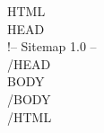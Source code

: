 \documentclass{article}
\newcommand{\Tag}[1]{{\lt}#1{\gt}}
\begin{document}
\Tag{HTML}\\
\Tag{HEAD}\\
\Tag{!-- Sitemap 1.0 --}\\
\Tag{/HEAD}\\
\Tag{BODY}\\

%
\Tag{/BODY}\\
\Tag{/HTML}\\
\end{document}
